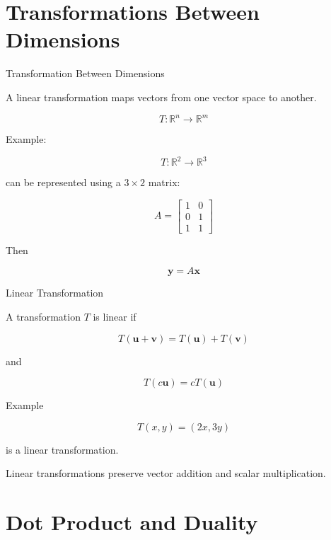 \documentclass[aspectratio=169]{beamer}
\begin{document}
\section{Transformations Between Dimensions}

\begin{frame}{Transformation Between Dimensions}
\small

A linear transformation maps vectors from one vector space to another.

$$
T:\mathbb{R}^n\rightarrow\mathbb{R}^m
$$

Example:

$$
T:\mathbb{R}^2\rightarrow\mathbb{R}^3
$$

can be represented using a $3\times2$ matrix:

$$
A=
\begin{bmatrix}
1&0\\
0&1\\
1&1
\end{bmatrix}
$$

Then

$$
\mathbf{y}=A\mathbf{x}
$$

\end{frame}

\begin{frame}{Linear Transformation}
\small

A transformation $T$ is linear if

$$
T(\mathbf{u}+\mathbf{v})
=
T(\mathbf{u})+T(\mathbf{v})
$$

and

$$
T(c\mathbf{u})=cT(\mathbf{u})
$$

\begin{block}{Example}

$$
T(x,y)=(2x,3y)
$$

is a linear transformation.
\end{block}

Linear transformations preserve vector addition and scalar multiplication.

\end{frame}

\section{Dot Product and Duality}
\end{document}
